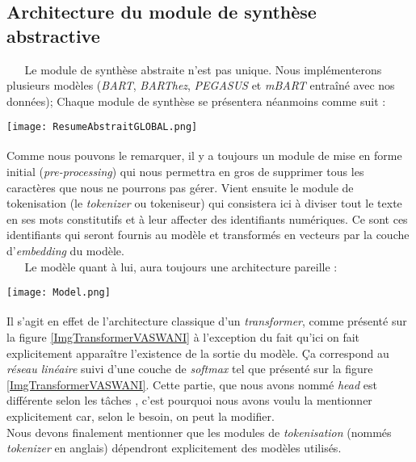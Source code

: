 \subsection{Architecture du module de synthèse abstractive}
$ _{} $ $ _{} $ $ _{} $ $ _{} $ $ _{} $Le module de synthèse abstraite n'est pas unique. Nous implémenterons plusieurs modèles (\textit{BART}, \textit{BARThez}, \textit{PEGASUS} et \textit{mBART} entraîné avec nos données); Chaque module de synthèse se présentera néanmoins comme suit :
$ _{ } $\\
\begin{center}
\texttt{[image: ResumeAbstraitGLOBAL.png]}
\label{ArchiGloAbstract}
\end{center}
$ _{ } $\\
Comme nous pouvons le remarquer, il y a toujours un module de mise en forme initial (\textit{pre-processing}) qui nous permettra en gros de supprimer tous les caractères que nous ne pourrons pas gérer. Vient ensuite le module de tokenisation (le \textit{tokenizer} ou tokeniseur) \cite{GRAAL_HF_tunstall2022natural}  qui consistera ici à diviser tout le texte en ses mots constitutifs et à leur affecter des identifiants numériques. Ce sont ces identifiants qui seront fournis au modèle et transformés en vecteurs par la couche d'\textit{embedding} du modèle.\\
$ _{} $ $ _{} $ $ _{} $ $ _{} $ $ _{} $Le modèle quant à lui, aura toujours une architecture pareille :
$ _{ } $\\
\begin{center}
\texttt{[image: Model.png]}
\end{center}
$ _{ } $\\
Il s'agit en effet de l'architecture classique d'un \textit{transformer}, comme présenté sur la figure \ref{ImgTransformerVASWANI} à l'exception du fait qu'ici on fait ex\-pli\-ci\-te\-ment ap\-pa\-raî\-tre l'existence de la sortie du modèle. Ça correspond au \textit{réseau linéaire} suivi d'une couche de \textit{softmax} tel que présenté sur la figure \ref{ImgTransformerVASWANI}. Cette partie, que nous avons nommé \textit{head} est différente selon les tâches \cite{HF_wolf2020transformers}, c'est pourquoi nous avons voulu la mentionner explicitement car, selon le besoin, on peut la modifier.\\
Nous devons finalement mentionner que les modules de \textit{tokenisation} (nommés \textit{tokenizer} en anglais) dépendront explicitement des modèles utilisés.
